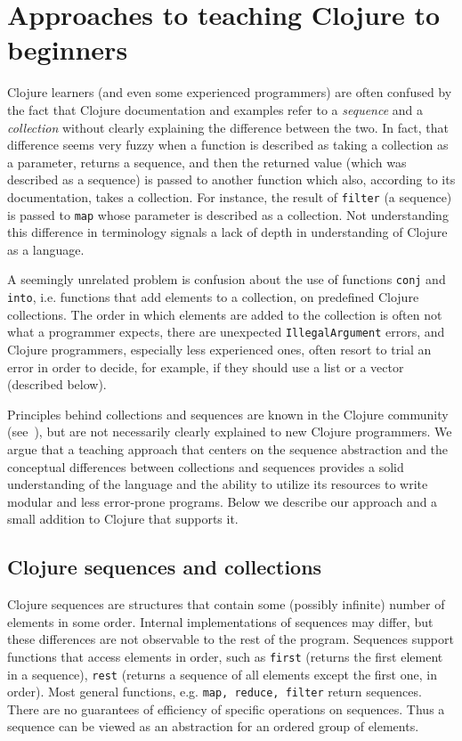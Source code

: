 \documentclass[submission,copyright,creativecommons]{eptcs}
\newcommand{\allcomments}[1]{{#1}}
\newcommand{\todo}[1]{{\bf \color{magenta}{\allcomments{ To-do: {#1}}}}}
\newcommand{\clocode}[1]{{\tt {#1}}}
\begin{document}

\section{Approaches to teaching Clojure to beginners}\label{sec:approaches}
Clojure learners (and even some experienced programmers) are often confused by the fact that Clojure documentation and examples refer to a {\it sequence} and a {\it collection} without clearly explaining the difference between the two. In fact, that difference seems very fuzzy when a function is described as taking a collection as a parameter, returns a sequence, and then the returned value (which was described as a sequence) is passed to another function which also, according to its documentation, takes a collection. For instance, the result of \clocode{filter} (a sequence) is passed to \clocode{map} whose parameter is described as a collection.  Not understanding this difference in terminology signals a lack of depth in understanding of Clojure as a language.

A seemingly unrelated problem is confusion about the use of functions \clocode{conj} and \clocode{into}, i.e. functions that add elements to a collection, on predefined Clojure collections. The order in which elements are added to the collection is often not what a programmer expects, there are unexpected {\tt IllegalArgument} errors, and Clojure programmers, especially less experienced ones, often resort to trial an error in order to decide, for example, if they should use a list or a vector (described below).

Principles behind collections and sequences are known in the Clojure community (see~\cite{JC}), but are not necessarily clearly explained to new Clojure programmers. We argue that a teaching approach that centers on the sequence abstraction and the conceptual differences between collections and sequences provides a solid understanding of the language and the ability to utilize its resources to write modular and less error-prone programs. Below we describe our approach and a small addition to Clojure that supports it. 

\subsection{Clojure sequences and collections}\label{seq-abstr}
Clojure sequences are structures that contain some (possibly infinite) number of elements in some order. Internal implementations of sequences may differ, but these differences are not observable to the rest of the program. Sequences support functions that access elements in order, such as \clocode{first} (returns the first element in a sequence), \clocode{rest} (returns a sequence of all elements except the first one, in order). Most general functions, e.g. \clocode{map, reduce, filter} return sequences. There are no guarantees of efficiency of specific operations on sequences. Thus a sequence can be viewed as an abstraction for an ordered group of elements. 
\end{document}
